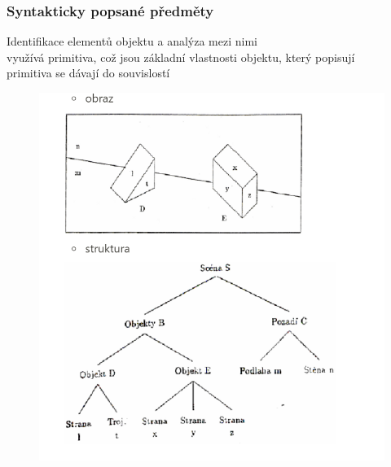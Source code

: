 \subsubsection*{Syntakticky popsané předměty}

Identifikace elementů objektu a analýza mezi nimi\\
využívá primitiva, což jsou základní vlastnosti objektu, který popisují\\
primitiva se dávají do souvislostí
\begin{figure}[H]
    \includegraphics[scale = 0.7]{images/syntakticke.png}
\end{figure}
